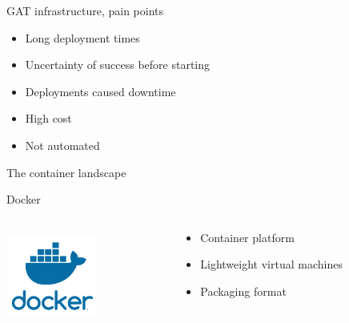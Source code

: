 \documentclass{beamer}
\newcommand{\imageframe}[2]{{
  \usebackgroundtemplate{\texttt{[image: \#1]}}
  \begin{frame}{\vspace{-6pt}\usebeamercolor[fg]{item}\huge{#2}}
  \end{frame}
}}
\begin{document}
  \begin{frame}{GAT infrastructure, pain points}
  \begin{itemize}
    \item Long deployment times
    \item Uncertainty of success before starting
    \item Deployments caused downtime
    \item High cost
    \item Not automated
  \end{itemize}
  \end{frame}


  \imageframe{images/container_landscape.jpg}{The container landscape}

  \begin{frame}{Docker}
    \begin{columns}[c]
      \begin{column}{.3\textwidth}
          \includegraphics[width=3cm,height=3cm]{images/docker_logo.png}
      \end{column}
      \begin{column}{.7\textwidth}
        \begin{itemize}
          \item Container platform
          \item Lightweight virtual machines
          \item Packaging format
        \end{itemize}
      \end{column}
    \end{columns}
  \end{frame}
\end{document}
